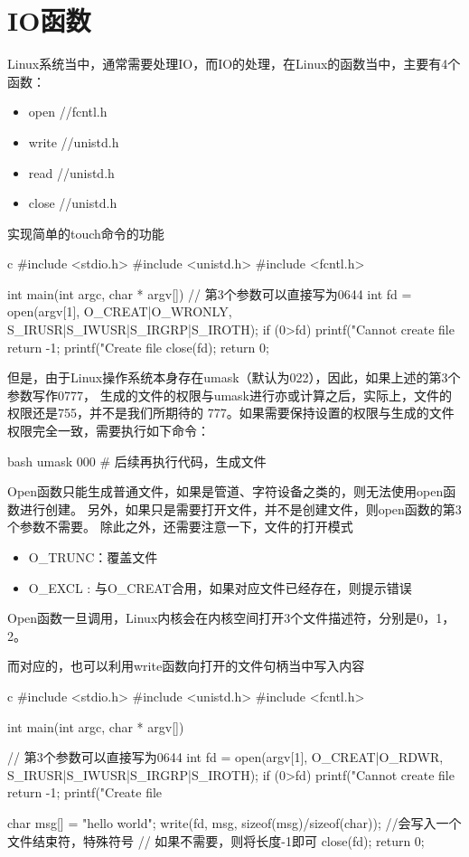 \section{IO函数}
Linux系统当中，通常需要处理IO，而IO的处理，在Linux的函数当中，主要有4个函数：
\begin{itemize}
  \item open //fcntl.h
  \item write //unistd.h
  \item read //unistd.h
  \item close //unistd.h
\end{itemize}

实现简单的touch命令的功能
\begin{code-block}{c}
#include <stdio.h>
#include <unistd.h>
#include <fcntl.h>

int main(int argc, char * argv[])
{
        // 第3个参数可以直接写为0644
        int fd = open(argv[1], O_CREAT|O_WRONLY,
                S_IRUSR|S_IWUSR|S_IRGRP|S_IROTH);
        if (0>fd)
        {
                printf("Cannot create file %
                return -1;
        }
        printf("Create file %
        close(fd);
        return 0;
}
\end{code-block}

但是，由于Linux操作系统本身存在umask（默认为022），因此，如果上述的第3个参数写作0777，
生成的文件的权限与umask进行亦或计算之后，实际上，文件的权限还是755，并不是我们所期待的
777。如果需要保持设置的权限与生成的文件权限完全一致，需要执行如下命令：
\begin{code-block}{bash}
umask 000
# 后续再执行代码，生成文件
\end{code-block}

Open函数只能生成普通文件，如果是管道、字符设备之类的，则无法使用open函数进行创建。
另外，如果只是需要打开文件，并不是创建文件，则open函数的第3个参数不需要。
除此之外，还需要注意一下，文件的打开模式
\begin{itemize}
  \item O\_TRUNC：覆盖文件
  \item O\_EXCL : 与O\_CREAT合用，如果对应文件已经存在，则提示错误
\end{itemize}

Open函数一旦调用，Linux内核会在内核空间打开3个文件描述符，分别是0，1，2。

而对应的，也可以利用write函数向打开的文件句柄当中写入内容
\begin{code-block}{c}
#include <stdio.h>
#include <unistd.h>
#include <fcntl.h>

int main(int argc, char * argv[])
{
        // 第3个参数可以直接写为0644
        int fd = open(argv[1], O_CREAT|O_RDWR,
                S_IRUSR|S_IWUSR|S_IRGRP|S_IROTH);
        if (0>fd)
        {
                printf("Cannot create file %
                return -1;
        }
        printf("Create file %

        char msg[] = "hello world";
        write(fd, msg, sizeof(msg)/sizeof(char)); //会写入一个文件结束符，特殊符号
                                                  // 如果不需要，则将长度-1即可
        close(fd);
        return 0;
}
\end{code-block}

